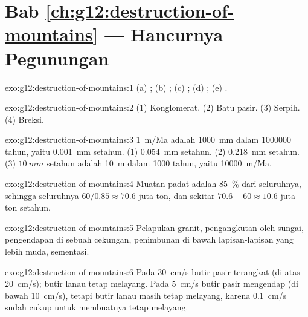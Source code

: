 \section*{Bab \ref{ch:g12:destruction-of-mountains} --- Hancurnya Pegunungan}

\begin{solution}{exo:g12:destruction-of-mountains:1}
(a) ; (b) ; (c) ;
(d) ; (e) .
\end{solution}

\begin{solution}{exo:g12:destruction-of-mountains:2}
(1) Konglomerat. (2) Batu pasir. (3) Serpih. (4) Breksi.
\end{solution}

\begin{solution}{exo:g12:destruction-of-mountains:3}
\qty{1}{m/Ma} adalah \qty{1000}{mm} dalam \num{1000000} tahun, yaitu
\qty{0.001}{mm} setahun. (1) \qty{0.054}{mm} setahun. (2) \qty{0.218}{mm}
setahun. (3) $\qty{10}{mm}$ setahun adalah \qty{10}{m} dalam 1000 tahun, yaitu
\qty{10000}{m/Ma}.
\end{solution}

\begin{solution}{exo:g12:destruction-of-mountains:4}
Muatan padat adalah \qty{85}{\percent} dari seluruhnya, sehingga seluruhnya $60/0.85
\approx 70.6$ juta ton, dan  sekitar $70.6 - 60 \approx
10.6$ juta ton setahun.
\end{solution}

\begin{solution}{exo:g12:destruction-of-mountains:5}
Pelapukan granit, pengangkutan oleh sungai, pengendapan di sebuah cekungan,
penimbunan di bawah lapisan-lapisan yang lebih muda, sementasi.
\end{solution}

\begin{solution}{exo:g12:destruction-of-mountains:6}
Pada \qty{30}{cm/s} butir pasir terangkat (di atas \qty{20}{cm/s}); butir
lanau tetap melayang. Pada \qty{5}{cm/s} butir pasir mengendap (di bawah
\qty{10}{cm/s}), tetapi butir lanau masih tetap melayang, karena
\qty{0.1}{cm/s} sudah cukup untuk membuatnya tetap melayang.
\end{solution}

